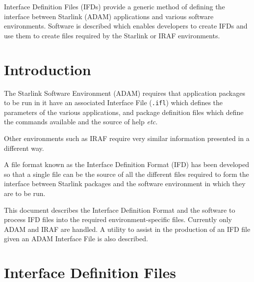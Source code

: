 \documentclass[twoside,11pt]{article}
\newcommand{\stardocinitials}  {SSN}
\newcommand{\stardocnumber}    {68.3}
\newcommand{\stardocabstract}  {Interface Definition Files (IFDs) provide a
generic method of defining the interface between Starlink
(\xref{ADAM}{sg4}{}) applications
and various software environments.  Software is described which enables
developers to create IFDs and use them to create files required by the
Starlink or
\htmladdnormallink{IRAF}{\IRAFURL} environments.}
\newcommand{\stardocname}{\stardocinitials /\stardocnumber}
\newcommand{\htmladdnormallink}[2]{#1}
\newenvironment{latexonly}{}{}
\newcommand{\xref}[3]{#1}
\newcommand{\xlabel}[1]{}
\newcommand{\latexonlytoc}[0]{\tableofcontents}
\newcommand{\IRAFURL}{http://www.starlink.ac.uk/iraf/web/iraf-homepage.html}
\renewcommand{\thepage}{\roman{page}}
\begin{document}
\stardocabstract
  \newpage
  \begin{latexonly}
    \setlength{\parskip}{0mm}
    \latexonlytoc
    \setlength{\parskip}{\medskipamount}
    \markboth{\stardocname}{\stardocname}
  \end{latexonly}
\cleardoublepage
\renewcommand{\thepage}{\arabic{page}}
\setcounter{page}{1}


\section{\xlabel{introduction}Introduction}
The
\xref{Starlink Software Environment (ADAM)}{sg4}{}
requires that application packages
to be run in it have an associated Interface File (\texttt{.ifl}) which defines
the parameters of the various applications, and package definition files
which define the commands available and the source of help \textit{etc.}

Other environments such as
\htmladdnormallink{IRAF}{\IRAFURL} require very similar information presented
in a different way.

A file format known as the Interface Definition Format (IFD) has been developed
so that a single file can be the source of all the different files required
to form the interface between Starlink packages and the software environment
in which they are to be run.

This document describes the Interface Definition Format and the software to
process IFD files into the required environment-specific files. Currently
only ADAM and IRAF are handled.  A utility to assist in the production of an
IFD file given an ADAM Interface File is also described.

\section{\xlabel{interface_definition_files}Interface Definition Files}
\end{document}

